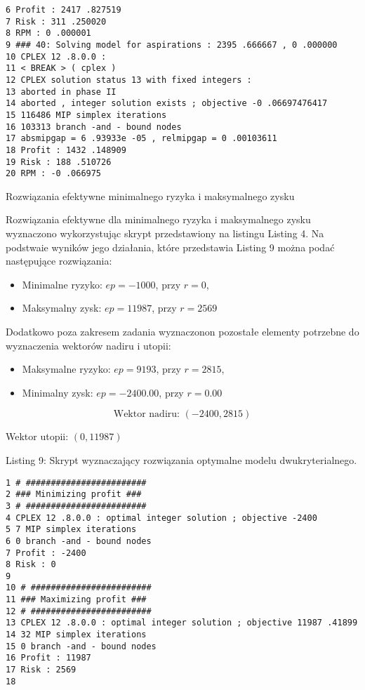 \documentclass[12pt]{article}
\begin{document}
\begin{verbatim}
6 Profit : 2417 .827519
7 Risk : 311 .250020
8 RPM : 0 .000001
9 ### 40: Solving model for aspirations : 2395 .666667 , 0 .000000
10 CPLEX 12 .8.0.0 :
11 < BREAK > ( cplex )
12 CPLEX solution status 13 with fixed integers :
13 aborted in phase II
14 aborted , integer solution exists ; objective -0 .06697476417
15 116486 MIP simplex iterations
16 103313 branch -and - bound nodes
17 absmipgap = 6 .93933e -05 , relmipgap = 0 .00103611
18 Profit : 1432 .148909
19 Risk : 188 .510726
20 RPM : -0 .066975
\end{verbatim}

Rozwiązania efektywne minimalnego ryzyka i maksymalnego zysku

Rozwiązania efektywne dla minimalnego ryzyka i maksymalnego zysku wyznaczono wykorzystując skrypt przedstawiony na listingu Listing 4. Na podstwaie wyników jego działania, które przedstawia Listing 9 można podać następujące rozwiązania:

\begin{itemize}
\item Minimalne ryzyko: $ep = -1000$, przy $r = 0$,
\item Maksymalny zysk: $ep = 11987$, przy $r = 2569$
\end{itemize}

Dodatkowo poza zakresem zadania wyznaczonon pozostałe elementy potrzebne do wyznaczenia wektorów nadiru i utopii:

\begin{itemize}
\item Maksymalne ryzyko: $ep = 9193$, przy $r = 2815$,
\item Minimalny zysk: $ep = -2400.00$, przy $r = 0.00$
\end{itemize}

$$\text{Wektor nadiru: } (-2400, 2815)$$

Wektor utopii: $(0, 11987)$

Listing 9: Skrypt wyznaczający rozwiązania optymalne modelu dwukryterialnego.

\begin{verbatim}
1 # ########################
2 ### Minimizing profit ###
3 # ########################
4 CPLEX 12 .8.0.0 : optimal integer solution ; objective -2400
5 7 MIP simplex iterations
6 0 branch -and - bound nodes
7 Profit : -2400
8 Risk : 0
9
10 # ########################
11 ### Maximizing profit ###
12 # ########################
13 CPLEX 12 .8.0.0 : optimal integer solution ; objective 11987 .41899
14 32 MIP simplex iterations
15 0 branch -and - bound nodes
16 Profit : 11987
17 Risk : 2569
18
\end{verbatim}
\end{document}
